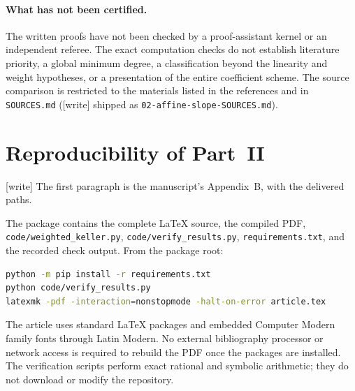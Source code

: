\documentclass[11pt,a4paper]{article}
\numberwithin{equation}{section}
\theoremstyle{definition}
\theoremstyle{remark}
\newcommand{\rpath}[1]{\nolinkurl{#1}}
\begin{document}
\paragraph{What has not been certified.}
The written proofs have not been checked by a proof-assistant kernel or
an independent referee. The exact computation checks do not establish
literature priority, a global minimum degree, a classification beyond the
linearity and weight hypotheses, or a presentation of the entire
coefficient scheme. The source comparison is restricted to the materials
listed in the references and in \rpath{SOURCES.md}
(\textup{[write]} shipped as \rpath{02-affine-slope-SOURCES.md}).

\section{Reproducibility of Part~II}
\label{wkr:as:sec:repro}

\textup{[write]} The first paragraph is the manuscript's Appendix~B,
with the delivered paths.

The package contains the complete \LaTeX{} source, the compiled PDF,
\rpath{code/weighted_keller.py}, \rpath{code/verify_results.py},
\rpath{requirements.txt}, and the recorded check output. From the
package root:
\begin{lstlisting}[language=bash]
python -m pip install -r requirements.txt
python code/verify_results.py
latexmk -pdf -interaction=nonstopmode -halt-on-error article.tex
\end{lstlisting}
The article uses standard \LaTeX{} packages and embedded Computer Modern
family fonts through Latin Modern. No external bibliography processor or
network access is required to rebuild the PDF once the packages are
installed. The verification scripts perform exact rational and symbolic
arithmetic; they do not download or modify the repository.
\end{document}
